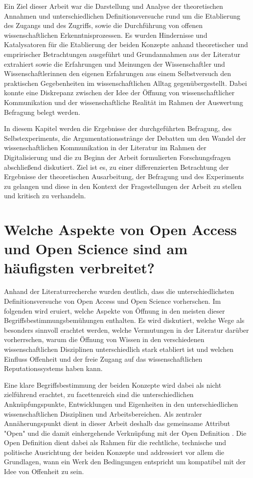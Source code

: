 Ein Ziel dieser Arbeit war die Darstellung und Analyse der theoretischen Annahmen und unterschiedlichen Definitionsversuche rund um die Etablierung des Zugangs und des Zugriffs, sowie die Durchführung von offenen wissenschaftlichen Erkenntnisprozessen. Es wurden Hindernisse und Katalysatoren für die Etablierung der beiden Konzepte anhand theoretischer und empririscher Betrachtungen ausgeführt und Grundannahmen aus der Literatur extrahiert sowie die Erfahrungen und Meinungen der Wissenschaftler und Wissenschaftlerinnen den eigenen Erfahrungen aus einem Selbstversuch den praktischen Gegebenheiten im wissenschaftlichen Alltag gegenübergestellt. Dabei konnte eine Diskrepanz zwischen der Idee der Öffnung von wissenschaftlicher Kommunikation und der wissenschaftliche Realität \cite{Scheliga_2014} im Rahmen der Auswertung Befragung belegt werden.

In diesem Kapitel werden die Ergebnisse der durchgeführten Befragung, des Selbstexperiments, die Argumentationsstränge der Debatten um den Wandel der wissenschaftlichen Kommunikation in der Literatur im Rahmen der Digitalisierung und die zu Beginn der Arbeit formulierten Forschungsfragen abschließend diskutiert. Ziel ist es, zu einer differenzierten Betrachtung der Ergebnisse der theoretischen Ausarbeitung, der Befragung und des Experiments zu gelangen und diese in den Kontext der Fragestellungen der Arbeit zu stellen und kritisch zu verhandeln.

\section{Welche Aspekte von Open Access und Open Science sind am häufigsten verbreitet?}

Anhand der Literaturrecherche wurden deutlich, dass die unterschiedlichsten Definitionsversuche von Open Access und Open Science vorherschen. Im folgenden wird eruiert, welche Aspekte von Öffnung in den meisten dieser Begriffsbestimmungsbemühungen enthalten. Es wird diskutiert, welche Wege als besonders sinnvoll erachtet werden, welche Vermutungen in der Literatur darüber vorherrschen, warum die Öffnung von Wissen in den verschiedenen wissenschaftlichen Disziplinen unterschiedlich stark etabliert ist und welchen Einfluss Offenheit und der freie Zugang auf das wissenschaftlichen Reputationssystems haben kann.

Eine klare Begriffsbestimmung der beiden Konzepte wird dabei als nicht zielführend erachtet, zu facettenreich sind die unterschiedlichen Anknüpfungspunkte, Entwicklungen und Eigenheiten in den unterschiedlichen wissenschaftlichen Disziplinen und Arbeitsbereichen. Als zentraler Annäherungspunkt dient in dieser Arbeit deshalb das gemeinsame Attribut "Open" und die damit einhergehende Verknüpfung mit der Open Definition \cite{open_definition}. Die Open Definition dient dabei als Rahmen für die rechtliche, technische und politische Ausrichtung der beiden Konzepte und addressiert vor allem die Grundlagen, wann ein Werk den Bedingungen entspricht um kompatibel mit der Idee von Offenheit zu sein.

